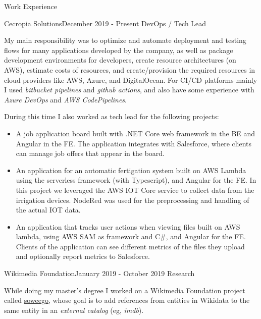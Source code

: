 \documentclass{resume} %
\begin{document}
\begin{rSection}{Work Experience}


\begin{rSubsection}{Cecropia Solutions}{December 2019 - Present}
{DevOps / Tech Lead}{}
\item[] My main responsibility was to optimize and automate deployment and testing flows for many applications developed by the company, as well as package development environments for developers, create resource architectures (on AWS), estimate costs of resources, and create/provision the required resources in cloud providers like AWS, Azure, and DigitalOcean. For CI/CD platforms mainly I used \textit{bitbucket pipelines} and \textit{github actions}, and also have some experience with \textit{Azure DevOps} and \textit{AWS CodePipelines}. 

During this time I also worked as tech lead for the following projects: 

\begin{itemize}
    \item A job application board built with .NET Core web framework in the BE and Angular in the FE. The application integrates with Salesforce, where clients can manage job offers that appear in the board. 
    \item An application for an automatic fertigation system built on AWS Lambda using the serverless framework (with Typescript), and Angular for the FE. In this project we leveraged the AWS IOT Core service to collect data from the irrigation devices. NodeRed was used for the preprocessing and handling of the actual IOT data.
    \item An application that tracks user actions when viewing files built on AWS lambda, using AWS SAM as framework and C\#, and Angular for the FE. Clients of the application can see different metrics of the files they upload and optionally report metrics to Salesforce. 
\end{itemize}
\end{rSubsection}

\begin{rSubsection}{Wikimedia Foundation}{January 2019 - October 2019}
{Research}{}
\item[] While doing my master's degree I worked on a Wikimedia Foundation project called \href{https://meta.wikimedia.org/wiki/Grants:Project/Hjfocs/soweego}{soweego}, whose goal is to add references from entities in Wikidata to the same entity in an \textit{external catalog} (eg, \textit{imdb}).


\end{rSubsection}
\end{rSection}
\end{document}
